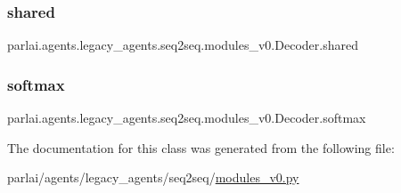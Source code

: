 \subsubsection{\texorpdfstring{shared}{shared}}
{\footnotesize\ttfamily parlai.\+agents.\+legacy\+\_\+agents.\+seq2seq.\+modules\+\_\+v0.\+Decoder.\+shared}

\mbox{\label{classparlai_1_1agents_1_1legacy__agents_1_1seq2seq_1_1modules__v0_1_1Decoder_a5c327e72bd68cb811bfdd4e38404a8e1}} 
\subsubsection{\texorpdfstring{softmax}{softmax}}
{\footnotesize\ttfamily parlai.\+agents.\+legacy\+\_\+agents.\+seq2seq.\+modules\+\_\+v0.\+Decoder.\+softmax}



The documentation for this class was generated from the following file\+:\begin{DoxyCompactItemize}
\item 
parlai/agents/legacy\+\_\+agents/seq2seq/\hyperlink{seq2seq_2modules__v0_8py}{modules\+\_\+v0.\+py}\end{DoxyCompactItemize}
